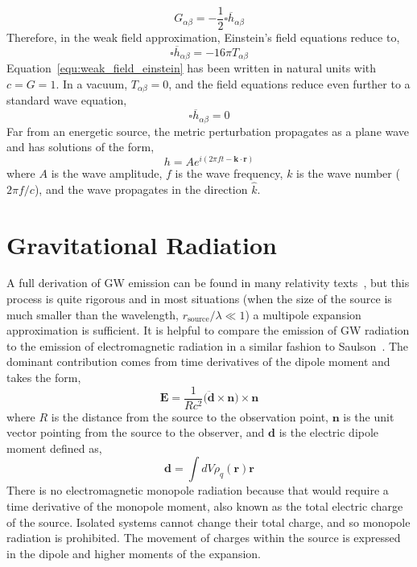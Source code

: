 \begin{equation}
    G_{\alpha\beta} = -\frac{1}{2}\square \overline{h}_{\alpha\beta}
\end{equation}
Therefore, in the weak field approximation, Einstein's field equations reduce to,
\begin{equation}
\label{equ:weak_field_einstein}
    \square \overline{h}_{\alpha\beta} = -16\pi T_{\alpha\beta}
\end{equation}
Equation~\ref{equ:weak_field_einstein} has been written in natural units with $c = G = 1$. In a vacuum, $T_{\alpha\beta} = 0$, and the field equations reduce even further to a standard wave equation,
\begin{equation}
    \square \overline{h}_{\alpha\beta} = 0
\end{equation}
Far from an energetic source, the metric perturbation propagates as a plane wave and has solutions of the form,
\begin{equation}
    h = Ae^{i(2\pi ft-\mathbf{k}\cdot\mathbf{r})}
\end{equation}
where $A$ is the wave amplitude, $f$ is the wave frequency, $k$ is the wave number ($2\pi f/c$), and the wave propagates in the direction $\hat{k}$.

\section{Gravitational Radiation}

A full derivation of GW emission can be found in many relativity texts~\cite{gravitation, schutz_2009, wald, weinberg1972gravitation}, but this process is quite rigorous and in most situations (when the size of the source is much smaller than the wavelength, $r_{\text{source}}/\lambda \ll 1$) a multipole expansion approximation is sufficient. It is helpful to compare the emission of GW radiation to the emission of electromagnetic radiation in a similar fashion to Saulson~\cite{bible}. The dominant contribution comes from time derivatives of the dipole moment and takes the form,
\begin{equation}
\label{equ:em_radiation}
    \mathbf{E} = \frac{1}{Rc^{2}}\big(\ddot{\mathbf{d}} \times \mathbf{n}\big) \times \mathbf{n}
\end{equation}
where $R$ is the distance from the source to the observation point, $\mathbf{n}$ is the unit vector pointing from the source to the observer, and $\mathbf{d}$ is the electric dipole moment defined as,
\begin{equation}
    \mathbf{d} = \int dV\rho_{q}(\mathbf{r})\mathbf{r}
\end{equation}
There is no electromagnetic monopole radiation because that would require a time derivative of the monopole moment, also known as the total electric charge of the source. Isolated systems cannot change their total charge, and so monopole radiation is prohibited. The movement of charges within the source is expressed in the dipole and higher moments of the expansion.

